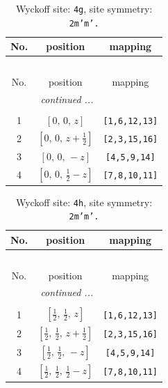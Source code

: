 \documentclass[fleqn,8pt]{jsarticle}
\begin{document}
\begin{longtable}{ccc}
\caption{Wyckoff site: {\tt 4g}, site symmetry: {\tt 2m'm'.}}
 \\
 \hline \hline
No. & position & mapping \\ \hline \endfirsthead

\multicolumn{2}{l}{\tablename\ \thetable{}} \\
 \hline \hline
No. & position & mapping \\ \hline \endhead

 \hline \hline
\multicolumn{2}{r}{\footnotesize\it continued ...} \\ \endfoot

 \hline \hline
\multicolumn{2}{r}{} \\ \endlastfoot

1 & $\left[ 0,\, 0,\, z \right]$ & {\tt [1,6,12,13]} \\ \hline
2 & $\left[ 0,\, 0,\, z + \frac{1}{2} \right]$ & {\tt [2,3,15,16]} \\ \hline
3 & $\left[ 0,\, 0,\, - z \right]$ & {\tt [4,5,9,14]} \\ \hline
4 & $\left[ 0,\, 0,\, \frac{1}{2} - z \right]$ & {\tt [7,8,10,11]} \\
\end{longtable}
\renewcommand{\arraystretch}{1.2}
\begin{longtable}{ccc}
\caption{Wyckoff site: {\tt 4h}, site symmetry: {\tt 2m'm'.}}
 \\
 \hline \hline
No. & position & mapping \\ \hline \endfirsthead

\multicolumn{2}{l}{\tablename\ \thetable{}} \\
 \hline \hline
No. & position & mapping \\ \hline \endhead

 \hline \hline
\multicolumn{2}{r}{\footnotesize\it continued ...} \\ \endfoot

 \hline \hline
\multicolumn{2}{r}{} \\ \endlastfoot

1 & $\left[ \frac{1}{2},\, \frac{1}{2},\, z \right]$ & {\tt [1,6,12,13]} \\ \hline
2 & $\left[ \frac{1}{2},\, \frac{1}{2},\, z + \frac{1}{2} \right]$ & {\tt [2,3,15,16]} \\ \hline
3 & $\left[ \frac{1}{2},\, \frac{1}{2},\, - z \right]$ & {\tt [4,5,9,14]} \\ \hline
4 & $\left[ \frac{1}{2},\, \frac{1}{2},\, \frac{1}{2} - z \right]$ & {\tt [7,8,10,11]} \\
\end{longtable}
\end{document}

